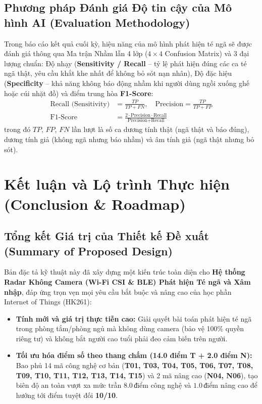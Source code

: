 \documentclass{hcmut-report}
\begin{document}
\subsection[Phương pháp Đánh giá Độ tin cậy AI]{Phương pháp Đánh giá Độ tin cậy của Mô hình AI (Evaluation Methodology)}
Trong báo cáo kết quả cuối kỳ, hiệu năng của mô hình phát hiện té ngã sẽ được đánh giá thông qua Ma trận Nhầm lẫn 4 lớp ($4 \times 4$ Confusion Matrix) và 3 đại lượng chuẩn: Độ nhạy (\textbf{Sensitivity / Recall} -- tỷ lệ phát hiện đúng các ca té ngã thật, yêu cầu khắt khe nhất để không bỏ sót nạn nhân), Độ đặc hiệu (\textbf{Specificity} -- khả năng không báo động nhầm khi người dùng ngồi xuống ghế hoặc cúi nhặt đồ) và điểm trung hòa \textbf{F1-Score}:
\begin{align}
  \text{Recall (Sensitivity)} &= \frac{TP}{TP + FN}, \quad
  \text{Precision} = \frac{TP}{TP + FP} \nonumber \\[4pt]
  \text{F1-Score} &= \frac{2 \cdot \text{Precision} \cdot \text{Recall}}{\text{Precision} + \text{Recall}} \label{eq:f1_metrics}
\end{align}
trong đó $TP$, $FP$, $FN$ lần lượt là số ca dương tính thật (ngã thật và báo đúng), dương tính giả (không ngã nhưng báo nhầm) và âm tính giả (ngã thật nhưng bỏ sót).

\section[Kết luận và Lộ trình Thực hiện]{Kết luận và Lộ trình Thực hiện (Conclusion \& Roadmap)}

\subsection[Tổng kết Giá trị của Thiết kế Đề xuất]{Tổng kết Giá trị của Thiết kế Đề xuất (Summary of Proposed Design)}
Bản đặc tả kỹ thuật này đã xây dựng một kiến trúc toàn diện cho \textbf{Hệ thống Radar Không Camera (Wi-Fi CSI \& BLE) Phát hiện Té ngã và Xâm nhập}, đáp ứng trọn vẹn mọi yêu cầu bắt buộc và nâng cao của học phần Internet of Things (HK261):
\begin{itemize}
  \item \textbf{Tính mới và giá trị thực tiễn cao:} Giải quyết bài toán phát hiện té ngã trong phòng tắm/phòng ngủ mà không dùng camera (bảo vệ 100\% quyền riêng tư) và không bắt người cao tuổi phải đeo cảm biến trên người.
  \item \textbf{Tối ưu hóa điểm số theo thang chấm (14.0 điểm T + 2.0 điểm N):} Bao phủ 14 mã công nghệ cơ bản (\textbf{T01, T03, T04, T05, T06, T07, T08, T09, T10, T11, T12, T13, T14, T15}) và 2 mã nâng cao (\textbf{N04, N06}), tạo biên độ an toàn vượt xa mức trần $8.0\,\text{điểm}$ công nghệ và $1.0\,\text{điểm}$ nâng cao để hướng tới điểm tuyệt đối \textbf{10/10}.
\end{itemize}
\end{document}
